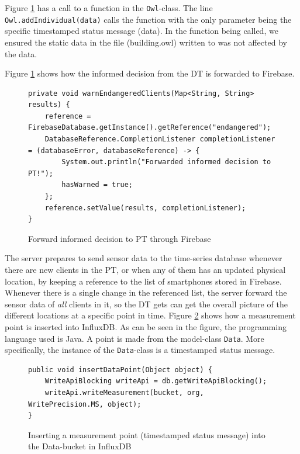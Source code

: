 \documentclass{article}
\begin{document}
Figure \ref{fig:server_forward_informed_decision} has a call to a function in the \verb|Owl|-class. The line \verb|Owl.addIndividual(data)| calls the function with the only parameter being the specific timestamped status message (data). In the function being called, we ensured the static data in the file (building.owl) written to was not affected by the data.


Figure \ref{fig:server_forward_informed_decision} shows how the informed decision from the DT is forwarded to Firebase.
\begin{figure}[H]
    \centering
    \begin{small}
    \begin{verbatim}
private void warnEndangeredClients(Map<String, String> results) {
    reference = FirebaseDatabase.getInstance().getReference("endangered");
    DatabaseReference.CompletionListener completionListener = (databaseError, databaseReference) -> {
        System.out.println("Forwarded informed decision to PT!");
        hasWarned = true;
    };
    reference.setValue(results, completionListener);
}
    \end{verbatim}
    \end{small}
    \caption{Forward informed decision to PT through Firebase}
    \label{fig:server_forward_informed_decision}
\end{figure}


The server prepares to send sensor data to the time-series database whenever there are new clients in the PT, or when any of them has an updated physical location, by keeping a reference to the list of smartphones stored in Firebase. Whenever there is a single change in the referenced list, the server forward the sensor data of \emph{all} clients in it, so the DT gets can get the overall picture of the different locations at a specific point in time. Figure \ref{fig:insert_point} shows how a measurement point is inserted into InfluxDB. As can be seen in the figure, the programming language used is Java. A point is made from the model-class \verb|Data|. More specifically, the instance of the \verb|Data|-class is a timestamped status message.

\begin{figure}[H]
    \centering
    \begin{small}
    \begin{verbatim}
public void insertDataPoint(Object object) {
    WriteApiBlocking writeApi = db.getWriteApiBlocking();
    writeApi.writeMeasurement(bucket, org, WritePrecision.MS, object);
}
    \end{verbatim}
    \end{small}
    \caption{Inserting a measurement point (timestamped status message) into the Data-bucket in InfluxDB}
    \label{fig:insert_point}
\end{figure}
\end{document}
